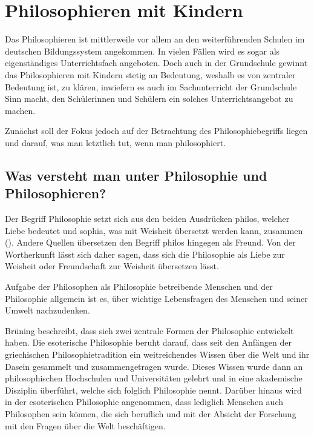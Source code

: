 \section{Philosophieren mit Kindern}

Das Philosophieren ist mittlerweile vor allem an den weiterführenden Schulen im deutschen Bildungssystem angekommen.
 In vielen Fällen wird es sogar als eigenständiges Unterrichtsfach angeboten. 
 Doch auch in der Grundschule gewinnt das Philosophieren mit Kindern stetig an Bedeutung, weshalb es von zentraler Bedeutung ist, zu klären, inwiefern es auch im Sachunterricht der 
 Grundschule Sinn macht, den Schülerinnen und Schülern ein solches Unterrichtsangebot zu machen. 
 
Zunächst soll der Fokus jedoch auf der Betrachtung des Philosophiebegriffs liegen und darauf, was man letztlich tut, wenn man philosophiert.



\subsection{Was versteht man unter Philosophie und Philosophieren?}

Der Begriff \glqq Philosophie\grqq{} setzt sich aus den beiden Ausdrücken \glqq philos\grqq{}, welcher Liebe bedeutet und \glqq sophia\grqq{}, was mit Weisheit übersetzt werden kann, zusammen (\cite[S.\,8]{BB10}). 
Andere Quellen übersetzen den Begriff \glqq philos\grqq{} hingegen als Freund\cite{GT16}. 
Von der Wortherkunft lässt sich daher sagen, dass sich die Philosophie als \glqq Liebe zur Weisheit\grqq{} oder \glqq Freundschaft zur Weisheit\grqq{} übersetzen lässt. 

Aufgabe der Philosophen als Philosophie betreibende Menschen und der Philosophie allgemein ist es, \glqq über wichtige Lebensfragen\grqq{} des Menschen und seiner Umwelt nachzudenken\cite[S.\,8]{BB10}. 

Brüning beschreibt, dass sich zwei zentrale Formen der Philosophie entwickelt haben. 
Die esoterische Philosophie beruht darauf, dass seit den Anfängen der griechischen Philosophietradition ein weitreichendes Wissen über die Welt und ihr Dasein gesammelt und zusammengetragen wurde. 
Dieses Wissen wurde dann an philosophischen Hochschulen und Universitäten gelehrt und in eine akademische Disziplin überführt, welche sich folglich Philosophie nennt. 
Darüber hinaus wird in der esoterischen Philosophie angenommen, dass lediglich Menschen auch Philosophen sein können, die sich beruflich und mit der Absicht der Forschung mit den Fragen über die Welt beschäftigen.

